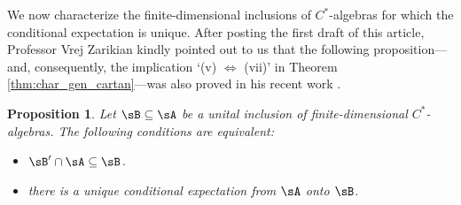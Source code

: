 \documentclass[12pt,a4paper]{amsart}
\theoremstyle{plain}
\newtheorem{prop}[theorem]{Proposition}
\theoremstyle{definition}
\theoremstyle{remark}
\numberwithin{equation}{section}
\theoremstyle{ser}
\theoremstyle{serr}
\theoremstyle{ser}
\theoremstyle{ser}
\theoremstyle{collabquestion}
\newcommand{\<}{\langle}
\renewcommand{\>}{\rangle}
\begin{document}
We now characterize the finite-dimensional inclusions of $C^*$-algebras for which the conditional expectation is unique. After posting the first draft of this article, Professor Vrej Zarikian kindly pointed out to us that the following proposition—and, consequently, the implication `(v) $\iff$ (vii)' in Theorem \ref{thm:char_gen_cartan}—was also proved in his recent work \cite[Theorem 2.4-((v) $\iff$ (vi))]{zarikian2026}.

 
\begin{prop}\label{lem:rel_com_iff_uniq_exp}\label{prop:rel_com_iff_uniq_cond}
    Let $\sB\subseteq\sA$ be a unital inclusion of finite-dimensional $C^*$-algebras. The following conditions are equivalent: 
    \begin{itemize}
        \item[(i)] $\sB' \cap \sA \subseteq \sB$.
        \item[(ii)] there is a unique conditional expectation from $\sA$ onto $\sB$.
    \end{itemize}
\end{prop}
\end{document}
